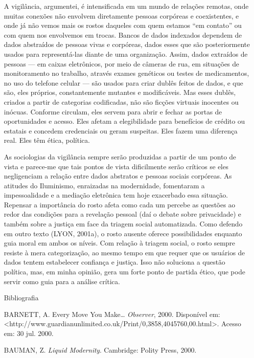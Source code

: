 A vigilância, argumentei, é intensificada em um mundo de relações
remotas, onde muitas conexões não envolvem diretamente pessoas corpóreas
e coexistentes, e onde já não vemos mais os rostos daqueles com quem
estamos ``em contato'' ou com quem nos envolvemos em trocas. Bancos de
dados indexados dependem de dados abstraídos de pessoas vivas e
corpóreas, dados esses que são posteriormente usados para representá-las
diante de uma organização. Assim, dados extraídos de pessoas --- em
caixas eletrônicos, por meio de câmeras de rua, em situações de
monitoramento no trabalho, através exames genéticos ou testes de
medicamentos, no uso do telefone celular --- são usados para criar
dublês feitos de dados, e que são, eles próprios, constantemente
mutantes e modificáveis. Mas esses dublês, criados a partir de
categorias codificadas, não são ficções virtuais inocentes ou inócuas.
Conforme circulam, eles servem para abrir e fechar as portas de
oportunidades e acesso. Eles afetam a elegibilidade para benefícios de
crédito ou estatais e concedem credenciais ou geram suspeitas. Eles
fazem uma diferença real. Eles têm ética, política.

As sociologias da vigilância sempre serão produzidas a partir de um
ponto de vista e parece-me que tais pontos de vista dificilmente serão
críticos se eles negligenciam a relação entre dados abstratos e pessoas
sociais corpóreas. As atitudes do Iluminismo, enraizadas na modernidade,
fomentaram a impessoalidade e a mediação eletrônica tem hoje exacerbado
essa situação. Repensar a importância do rosto afeta como cada um
percebe as questões ao redor das condições para a revelação pessoal (daí
o debate sobre privacidade) e também sobre a justiça em face da triagem
social automatizada. Como defendo em outro texto (LYON, 2001a), o rosto
ausente oferece possibilidades enquanto guia moral em ambos os níveis.
Com relação à triagem social, o rosto sempre resiste à mera
categorização, ao mesmo tempo em que requer que os usuários de dados
tentem estabelecer confiança e justiça. Isso não soluciona a questão
política, mas, em minha opinião, gera um forte ponto de partida ético,
que pode servir como guia para a análise crítica.

Bibliografia

BARNETT, A. Every Move You Make\ldots{} \emph{Observer}, 2000.
Disponível em:
\textless{}http://www.guardianunlimited.co.uk/Print/0,3858,4045760,00.html\textgreater{}.
Acesso em: 30 jul. 2000.

BAUMAN, Z. \emph{Liquid Modernity}. Cambridge: Polity Press, 2000.

